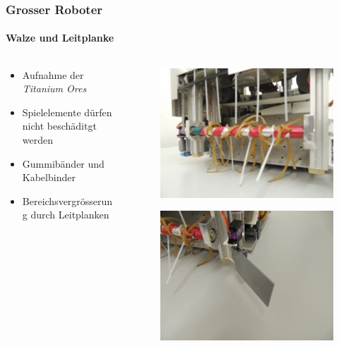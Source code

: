 \begin{frame}
	\frametitle{Grosser Roboter}
	\framesubtitle{Walze und Leitplanke}
	\begin{columns}
		\begin{column}{0.6 \textwidth}
			\begin{itemize}
				\item Aufnahme der \textit{Titanium Ores}
				\item Spielelemente dürfen nicht beschäditgt werden
				\item Gummibänder und Kabelbinder
				\item Bereichsvergrösserung durch Leitplanken
			\end{itemize}
		\end{column}
		\begin{column}{0.4 \textwidth}
			\vspace{-2.5em}
			\begin{figure}[h]
				\centering
				\includegraphics[width = 0.9 \textwidth]{../images/presentation/walze.jpg}
			\end{figure}
			\vspace{-2.2em}
			\begin{figure}[h]
				\centering
				\includegraphics[width = 0.9 \textwidth]{../images/presentation/leitplanke.jpg}
			\end{figure}
		\end{column}
	\end{columns}
\end{frame}

